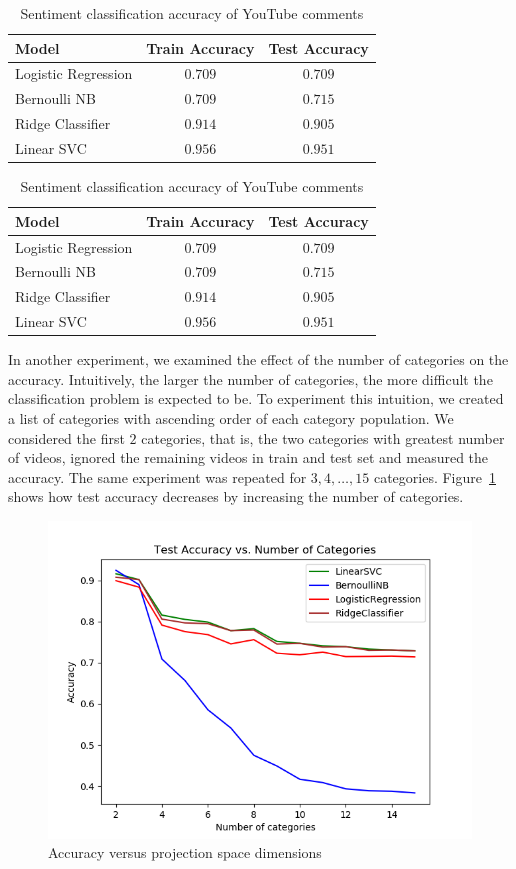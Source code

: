 \begin{table}%
\centering
\begin{tabular}{|l|c|c|}
\hline
Model & Train Accuracy & Test Accuracy \\
\hline
Logistic Regression & $0.709$ & $0.709$ \\
\hline
Bernoulli NB & $0.709$ & $0.715$ \\
\hline
Ridge Classifier & $0.914$ & $0.905$ \\
\hline
Linear SVC & $0.956$ & $0.951$ \\
\hline
\end{tabular}
\caption{Sentiment classification accuracy of YouTube comments}
\label{tab:accuracy}

\centering
\begin{tabular}{|l|c|c|}
\hline
Model & Train Accuracy & Test Accuracy \\
\hline
Logistic Regression & $0.709$ & $0.709$ \\
\hline
Bernoulli NB & $0.709$ & $0.715$ \\
\hline
Ridge Classifier & $0.914$ & $0.905$ \\
\hline
Linear SVC & $0.956$ & $0.951$ \\
\hline
\end{tabular}
\caption{Sentiment classification accuracy of YouTube comments}
\label{tab:accuracy}
\end{table}
 
In another experiment, we examined the effect of the number of categories on the accuracy. Intuitively, the larger the number of categories, the more difficult the classification problem is expected to be. To experiment this intuition, we created a list of categories with ascending order of each category population. We considered the first $2$ categories, that is, the two categories with greatest number of videos, ignored the remaining videos in train and test set and measured the accuracy. The same experiment was repeated for $3, 4, \ldots, 15$ categories.
Figure~\ref{fig:cat-num-test} shows how test accuracy decreases by increasing the number of categories.
\begin{figure}%
\includegraphics[width=1.0\columnwidth]{figures/cat-num-test-acc.png}%
\caption{Accuracy versus projection space dimensions}%
\label{fig:cat-num-test}%
\end{figure}